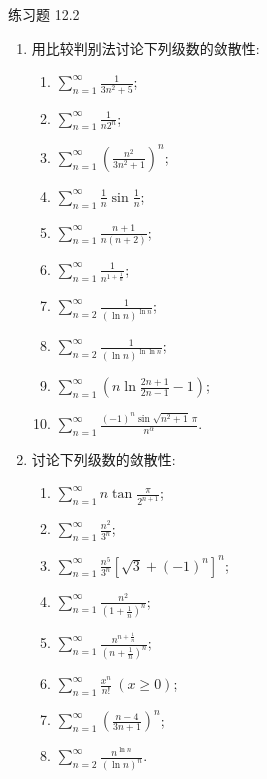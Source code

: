 \begin{exblock}{练习题 12.2}
\begin{enumerate}
  \item 用比较判别法讨论下列级数的敛散性:
  \begin{enumerate}
    \item $\displaystyle\sum_{n=1}^{\infty}\frac{1}{3n^{2}+5}$;
    \item $\displaystyle\sum_{n=1}^{\infty}\frac{1}{n2^{n}}$;
    \item $\displaystyle\sum_{n=1}^{\infty}\left(\frac{n^{2}}{3n^{2}+1}\right)^{n}$;
    \item $\displaystyle\sum_{n=1}^{\infty}\frac{1}{n}\sin\frac{1}{n}$;
    \item $\displaystyle\sum_{n=1}^{\infty}\frac{n+1}{n(n+2)}$;
    \item $\displaystyle\sum_{n=1}^{\infty}\frac{1}{n^{1+\frac{1}{n}}}$;
    \item $\displaystyle\sum_{n=2}^{\infty}\frac{1}{(\ln n)^{\ln n}}$;
    \item $\displaystyle\sum_{n=2}^{\infty}\frac{1}{(\ln n)^{\ln\ln n}}$;
    \item $\displaystyle\sum_{n=1}^{\infty}\left(n\ln\frac{2n+1}{2n-1}-1\right)$;
    \item $\displaystyle\sum_{n=1}^{\infty}\frac{(-1)^{n}\sin\sqrt{n^{2}+1}\,\pi}{n^{\alpha}}$.
  \end{enumerate}
  \item 讨论下列级数的敛散性:
  \begin{enumerate}
    \item $\displaystyle\sum_{n=1}^{\infty}n\tan\frac{\pi}{2^{n+1}}$;
    \item $\displaystyle\sum_{n=1}^{\infty}\frac{n^{2}}{3^{n}}$;
    \item $\displaystyle\sum_{n=1}^{\infty}\frac{n^{5}}{3^{n}}\left[\sqrt{3}+(-1)^{n}\right]^{n}$;
    \item $\displaystyle\sum_{n=1}^{\infty}\frac{n^{2}}{\left(1+\frac{1}{n}\right)^{n}}$;
    \item $\displaystyle\sum_{n=1}^{\infty}\frac{n^{n+\frac{1}{n}}}{\left(n+\frac{1}{n}\right)^{n}}$;
    \item $\displaystyle\sum_{n=1}^{\infty}\frac{x^{n}}{n!}\ (x\geqslant0)$;
    \item $\displaystyle\sum_{n=1}^{\infty}\left(\frac{n-4}{3n+1}\right)^{n}$;
    \item $\displaystyle\sum_{n=2}^{\infty}\frac{n^{\ln n}}{(\ln n)^{n}}$.
  \end{enumerate}

\end{enumerate}
\end{exblock}
